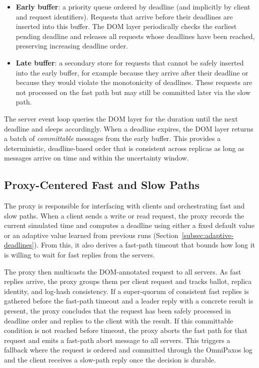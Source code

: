 \documentclass{article}
\begin{document}
\begin{itemize}
  \item \textbf{Early buffer}: a priority queue ordered by deadline (and implicitly by client and request identifiers). Requests that arrive before their deadlines are inserted into this buffer. The DOM layer periodically checks the earliest pending deadline and releases all requests whose deadlines have been reached, preserving increasing deadline order.
  \item \textbf{Late buffer}: a secondary store for requests that cannot be safely inserted into the early buffer, for example because they arrive after their deadline or because they would violate the monotonicity of deadlines. These requests are not processed on the fast path but may still be committed later via the slow path.
\end{itemize}

The server event loop queries the DOM layer for the duration until the next deadline and sleeps accordingly. When a deadline expires, the DOM layer returns a batch of \emph{committable} messages from the early buffer. This provides a deterministic, deadline-based order that is consistent across replicas as long as messages arrive on time and within the uncertainty window.

\subsection{Proxy-Centered Fast and Slow Paths}
The proxy is responsible for interfacing with clients and orchestrating fast and slow paths. When a client sends a write or read request, the proxy records the current simulated time and computes a deadline using either a fixed default value or an adaptive value learned from previous runs (Section~\ref{subsec:adaptive-deadlines}). From this, it also derives a fast-path timeout that bounds how long it is willing to wait for fast replies from the servers.

The proxy then multicasts the DOM-annotated request to all servers. As fast replies arrive, the proxy groups them per client request and tracks ballot, replica identity, and log-hash consistency. If a super-quorum of consistent fast replies is gathered before the fast-path timeout and a leader reply with a concrete result is present, the proxy concludes that the request has been safely processed in deadline order and replies to the client with the result. If this committable condition is not reached before timeout, the proxy aborts the fast path for that request and emits a fast-path abort message to all servers. This triggers a fallback where the request is ordered and committed through the OmniPaxos log and the client receives a slow-path reply once the decision is durable.
\end{document}
